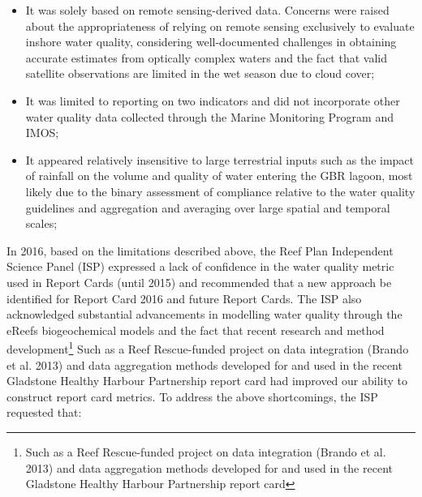 \begin{itemize}
\item It was solely based on remote sensing-derived data. Concerns were raised about the
appropriateness of relying on remote sensing exclusively to evaluate inshore water quality,
considering well-documented challenges in obtaining accurate estimates from optically complex waters
and the fact that valid satellite observations are limited in the wet season due to cloud cover;
\item It was limited to reporting on two indicators and did not incorporate other water quality data
collected through the Marine Monitoring Program and IMOS; 
\item It appeared relatively insensitive to large terrestrial inputs such as the impact of rainfall
on the volume and quality of water entering the GBR lagoon, most likely due to the binary assessment
of compliance relative to the water quality guidelines and aggregation and averaging over large
spatial and temporal scales;
\end{itemize}

In 2016, based on the limitations described above, the Reef Plan Independent Science Panel (ISP)
expressed a lack of confidence in the water quality metric used in Report Cards (until 2015) and
recommended that a new approach be identified for Report Card 2016 and future Report Cards. The ISP
also acknowledged substantial advancements in modelling water quality through the eReefs
biogeochemical models and the fact that recent research and method development\footnote{Such as a
Reef Rescue-funded project on data integration (Brando et al. 2013) and data aggregation methods
developed for and used in the recent Gladstone Healthy Harbour Partnership report card} Such as a
Reef Rescue-funded project on data integration (Brando et al. 2013) and data aggregation methods
developed for and used in the recent Gladstone Healthy Harbour Partnership report card had improved
our ability to construct report card metrics. To address the above shortcomings, the ISP requested
that:

